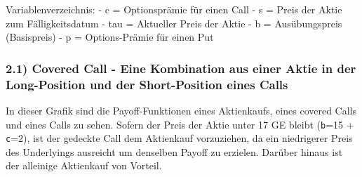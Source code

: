 \documentclass[paper=landscape]{scrartcl}
\begin{document}
    Variablenverzeichnis: - c = Optionsprämie für einen Call - s = Preis der
Aktie zum Fälligkeitsdatum - tau = Aktueller Preis der Aktie - b =
Ausübungspreis (Basispreis) - p = Options-Prämie für einen Put

    \hypertarget{covered-call---eine-kombination-aus-einer-aktie-in-der-long-position-und-der-short-position-eines-calls}{%
\subsubsection{2.1) Covered Call - Eine Kombination aus einer Aktie in
der Long-Position und der Short-Position eines
Calls}\label{covered-call---eine-kombination-aus-einer-aktie-in-der-long-position-und-der-short-position-eines-calls}}

In dieser Grafik sind die Payoff-Funktionen eines Aktienkaufs, eines
covered Calls und eines Calls zu sehen. Sofern der Preis der Aktie unter
17 GE bleibt (\texttt{b}=15 + \texttt{c}=2), ist der gedeckte Call dem
Aktienkauf vorzuziehen, da ein niedrigerer Preis des Underlyings
ausreicht um denselben Payoff zu erzielen. Darüber hinaus ist der
alleinige Aktienkauf von Vorteil.
\end{document}
